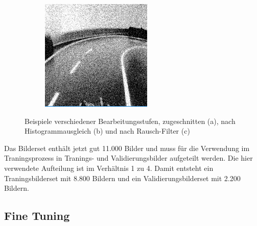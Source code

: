 \begin{figure}[h]
\begin{subfigure}{.33\textwidth}
	 	  \caption{}
		  \label{fig:imageb}
	\end{subfigure}%
	\begin{subfigure}{.33\textwidth}
	\centering
		  \includegraphics[width=0.9\linewidth]{figures/200x200Gauss.png}
	 	  \caption{}
		  \label{fig:imagec}
	\end{subfigure}%
	\caption{Beispiele verschiedener Bearbeitungsstufen, zugeschnitten (a), nach Histogrammausgleich (b) und nach Rausch-Filter (c) }
	\label{fig:pipelineexample}
\end{figure}%

Das Bilderset enthält jetzt gut 11.000 Bilder und muss für die Verwendung im Traningsprozess in Tranings- und Validierungsbilder aufgeteilt werden. Die hier verwendete Aufteilung ist im Verhältnis 1 zu 4. Damit entsteht ein Traningsbilderset mit 8.800 Bildern und ein Validierungsbilderset mit 2.200 Bildern.


\subsection{Fine Tuning}


